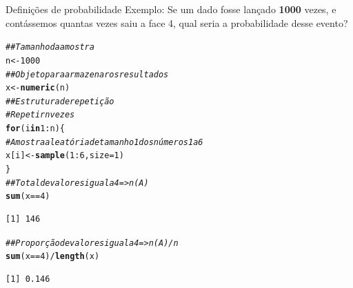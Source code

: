 \documentclass[10pt]{beamer}\usepackage[]{graphicx}\usepackage[]{color}
\makeatletter
\newcommand{\hlnum}[1]{\textcolor[rgb]{0.686,0.059,0.569}{#1}}%
\newcommand{\hlcom}[1]{\textcolor[rgb]{0.678,0.584,0.686}{\textit{#1}}}%
\newcommand{\hlopt}[1]{\textcolor[rgb]{0,0,0}{#1}}%
\newcommand{\hlstd}[1]{\textcolor[rgb]{0.345,0.345,0.345}{#1}}%
\newcommand{\hlkwa}[1]{\textcolor[rgb]{0.161,0.373,0.58}{\textbf{#1}}}%
\newcommand{\hlkwb}[1]{\textcolor[rgb]{0.69,0.353,0.396}{#1}}%
\newcommand{\hlkwc}[1]{\textcolor[rgb]{0.333,0.667,0.333}{#1}}%
\newcommand{\hlkwd}[1]{\textcolor[rgb]{0.737,0.353,0.396}{\textbf{#1}}}%
\newenvironment{kframe}{%
 \def\at@end@of@kframe{}%
 \ifinner\ifhmode%
  \def\at@end@of@kframe{\end{minipage}}%
  \begin{minipage}{\columnwidth}%
 \fi\fi%
 \def\FrameCommand##1{\hskip\@totalleftmargin \hskip-\fboxsep
 \colorbox{shadecolor}{##1}\hskip-\fboxsep
     \hskip-\linewidth \hskip-\@totalleftmargin \hskip\columnwidth}%
 \MakeFramed {\advance\hsize-\width
   \@totalleftmargin\z@ \linewidth\hsize
   \@setminipage}}%
 {\par\unskip\endMakeFramed%
 \at@end@of@kframe}
\newenvironment{knitrout}{}{} %
\theoremstyle{definition}
\makeatother
\begin{document}
\begin{frame}[fragile]{Definições de probabilidade}
  Exemplo: Se um dado fosse lançado \textbf{1000} vezes, e contássemos
  quantas vezes saiu a face 4, qual seria a probabilidade desse evento?
\begin{knitrout}\footnotesize
{}\color{fgcolor}\begin{kframe}
\begin{alltt}
\hlcom{## Tamanho da amostra}
\hlstd{n} \hlkwb{<-} \hlnum{1000}
\hlcom{## Objeto para armazenar os resultados}
\hlstd{x} \hlkwb{<-} \hlkwd{numeric}\hlstd{(n)}
\hlcom{## Estrutura de repetição}
\hlcom{# Repetir n vezes}
\hlkwa{for}\hlstd{(i} \hlkwa{in} \hlnum{1}\hlopt{:}\hlstd{n)\{}
    \hlcom{# Amostra aleatória de tamanho 1 dos números 1 a 6}
    \hlstd{x[i]} \hlkwb{<-} \hlkwd{sample}\hlstd{(}\hlnum{1}\hlopt{:}\hlnum{6}\hlstd{,} \hlkwc{size} \hlstd{=} \hlnum{1}\hlstd{)}
\hlstd{\}}
\hlcom{## Total de valores igual a 4 => n(A)}
\hlkwd{sum}\hlstd{(x} \hlopt{==} \hlnum{4}\hlstd{)}
\end{alltt}
\begin{verbatim}
[1] 146
\end{verbatim}
\begin{alltt}
\hlcom{## Proporção de valores igual a 4 => n(A)/n}
\hlkwd{sum}\hlstd{(x} \hlopt{==} \hlnum{4}\hlstd{)}\hlopt{/}\hlkwd{length}\hlstd{(x)}
\end{alltt}
\begin{verbatim}
[1] 0.146
\end{verbatim}
\end{kframe}
\end{knitrout}
\end{frame}
\end{document}
